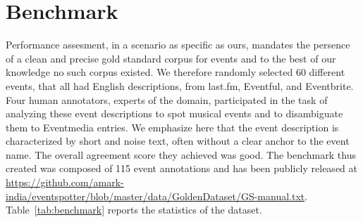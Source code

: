 \documentclass[10pt,a4paper]{article}
\begin{document}
%
%
%
%
%
%	
%
%	 


\section{Benchmark}
Performance assesment, in a scenario as specific as ours, mandates the persence of a clean and precise gold standard corpus for events and to the best of our knowledge no such corpus existed. We therefore randomly selected 60 different events, that all had English descriptions, from last.fm, Eventful, and Eventbrite. Four human annotators, experts of the domain, participated in the task of analyzing these event descriptions to spot musical events and to disambiguate them to Eventmedia entries. We emphasize here that the event description is characterized by short and noise text, often without a clear anchor to the event name.  The overall agreement score they achieved was good. The benchmark thus created was composed of 115 event annotations and has been publicly released at \url{https://github.com/amark-india/eventspotter/blob/master/data/GoldenDataset/GS-manual.txt}. Table~\ref{tab:benchmark} reports the statistics of the dataset.
\end{document}
